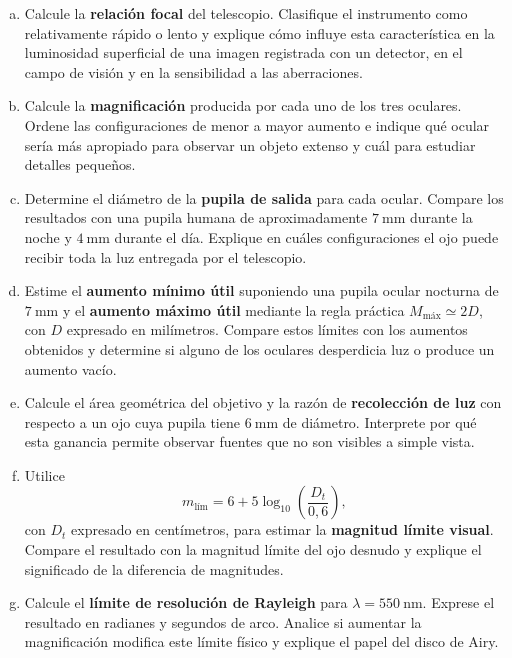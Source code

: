 \begin{enumerate}[a)]
    \item Calcule la \textbf{relación focal} del telescopio. Clasifique el
    instrumento como relativamente rápido o lento y explique cómo influye esta
    característica en la luminosidad superficial de una imagen registrada con
    un detector, en el campo de visión y en la sensibilidad a las aberraciones.

    \item Calcule la \textbf{magnificación} producida por cada uno de los tres
    oculares. Ordene las configuraciones de menor a mayor aumento e indique qué
    ocular sería más apropiado para observar un objeto extenso y cuál para
    estudiar detalles pequeños.

    \item Determine el diámetro de la \textbf{pupila de salida} para cada
    ocular. Compare los resultados con una pupila humana de aproximadamente
    $7~\text{mm}$ durante la noche y $4~\text{mm}$ durante el día. Explique en
    cuáles configuraciones el ojo puede recibir toda la luz entregada por el
    telescopio.

    \item Estime el \textbf{aumento mínimo útil} suponiendo una pupila ocular
    nocturna de $7~\text{mm}$ y el \textbf{aumento máximo útil} mediante la
    regla práctica $M_{\text{máx}}\simeq2D$, con $D$ expresado en milímetros.
    Compare estos límites con los aumentos obtenidos y determine si alguno de
    los oculares desperdicia luz o produce un aumento vacío.

    \item Calcule el área geométrica del objetivo y la razón de
    \textbf{recolección de luz} con respecto a un ojo cuya pupila tiene
    $6~\text{mm}$ de diámetro. Interprete por qué esta ganancia permite observar
    fuentes que no son visibles a simple vista.

    \item Utilice
    \[
        m_{\text{lím}}
        =6+5\log_{10}\!\left(\frac{D_t}{0{,}6}\right),
    \]
    con $D_t$ expresado en centímetros, para estimar la
    \textbf{magnitud límite visual}. Compare el resultado con la magnitud límite
    del ojo desnudo y explique el significado de la diferencia de magnitudes.

    \item Calcule el \textbf{límite de resolución de Rayleigh} para
    $\lambda=550~\text{nm}$. Exprese el resultado en radianes y segundos de
    arco. Analice si aumentar la magnificación modifica este límite físico y
    explique el papel del disco de Airy.


\end{enumerate}
